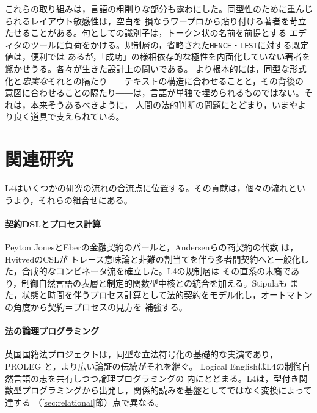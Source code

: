 \documentclass[11pt,a4paper]{ltjsarticle}
\newcommand{\code}[1]{\texttt{\small #1}}
\begin{document}
これらの取り組みは，言語の粗削りな部分も露わにした。同型性のために重んじられるレイアウト敏感性は，空白を
損なうワープロから貼り付ける著者を苛立たせることがある。句としての識別子は，トークン状の名前を前提とする
エディタのツールに負荷をかける。規制層の，省略された\code{HENCE}・\code{LEST}に対する既定値は，便利では
あるが，「成功」の様相依存的な極性を内面化していない著者を驚かせうる。各々が生きた設計上の問いである。
より根本的には，同型な形式化と\emph{忠実な}それとの隔たり――テキストの構造に合わせることと，その背後の
意図に合わせることの隔たり――は，言語が単独で埋められるものではない。それは，本来そうあるべきように，
人間の法的判断の問題にとどまり，いまやより良く道具で支えられている。

\section{関連研究}\label{sec:related}
L4はいくつかの研究の流れの合流点に位置する。その貢献は，個々の流れというより，それらの組合せにある。

\paragraph{契約DSLとプロセス計算}
Peyton JonesとEberの金融契約のパール\cite{pjeber2000composing}と，Andersenらの商契約の代数
\cite{andersen2006compositional}は，HvitvedのCSL\cite{hvitved2011thesis,hvitved2012trace}が
トレース意味論と非難の割当てを伴う多者間契約へと一般化した，合成的なコンビネータ流を確立した。L4の規制層は
その直系の末裔であり，制御自然言語の表層と制定的関数型中核との統合を加える。Stipula\cite{crafa2022stipula}も
また，状態と時間を伴うプロセス計算として法的契約をモデル化し，オートマトンの角度から契約＝プロセスの見方を
補強する。

\paragraph{法の論理プログラミング}
英国国籍法プロジェクト\cite{sergot1986bna}は，同型な立法符号化の基礎的な実演であり，PROLEG
\cite{satoh2011proleg}と，より広い論証の伝統\cite{prakken2015law,bench2012history}がそれを継ぐ。
Logical English\cite{kowalski2021logicalenglish}はL4の制御自然言語の志を共有しつつ論理プログラミングの
内にとどまる。L4は，型付き関数型プログラミングから出発し，関係的読みを基盤としてではなく変換によって達する
（\ref{sec:relational}節）点で異なる。
\end{document}
